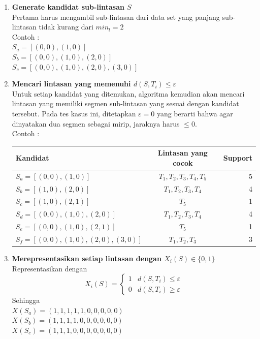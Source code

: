 \documentclass[a4paper,twoside]{article}
\begin{document}
\begin{enumerate}
	\item \textbf{Generate kandidat sub-lintasan $S$} \\
	Pertama harus mengambil sub-lintasan dari data set yang panjang sub-lintasan tidak kurang dari $min_l = 2$ \\
	Contoh : \\ $S_a = [(0,0),(1,0)]$ \\ $S_b = [(0,0),(1,0),(2,0)]$ \\ $S_c = [(0,0),(1,0),(2,0),(3,0)]$
	\item \textbf{Mencari lintasan yang memenuhi $d(S,T_i) \leq \varepsilon$} \\
	Untuk setiap kandidat yang ditemukan, algoritma kemudian akan mencari lintasan yang memiliki segmen sub-lintasan yang sesuai dengan kandidat tersebut. Pada tes kasus ini, ditetapkan $\varepsilon = 0$ yang berarti bahwa agar dinyatakan dua segmen sebagai mirip, jaraknya harus $\leq 0$. \\
	Contoh : \\
	\begin{tabular}{l|c|r}
		\textbf{Kandidat} & \textbf{Lintasan yang cocok} & \textbf{Support} \\
		\midrule
		$S_a = [(0,0),(1,0)]$ & $T_1,T_2,T_3,T_4,T_5$ & 5 \\
		$S_b = [(1,0),(2,0)]$ & $T_1,T_2,T_3,T_4$ & 4 \\
		$S_c = [(1,0),(2,1)]$ & $T_5$ & 1 \\
		$S_d = [(0,0),(1,0),(2,0)]$ & $T_1,T_2,T_3,T_4$ & 4 \\
		$S_e = [(0,0),(1,0),(2,1)]$ & $T_5$ & 1 \\
		$S_f = [(0,0),(1,0),(2,0),(3,0)]$ & $T_1,T_2,T_3$ & 3 \\
	\end{tabular}
	\item \textbf{Merepresentasikan setiap lintasan dengan $X_i(S) \in \{0,1\}$} \\
	Representasikan dengan 
	\begin{equation}
		X_i(S) = \begin{cases} 
			1 & d(S,T_i) \leq \varepsilon \\ 
			0 & d(S,T_i) \ge \varepsilon
		\end{cases}
	\end{equation} 
	Sehingga \\ $X(S_a) = (1,1,1,1,1,0,0,0,0,0)$ \\ $X(S_b) = (1,1,1,1,0,0,0,0,0,0)$ \\ $X(S_c) = (1,1,1,0,0,0,0,0,0,0)$ \\

\end{enumerate}
\end{document}
